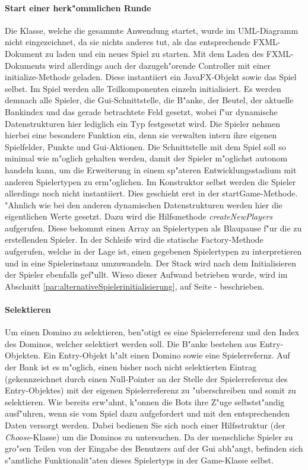 \paragraph{Start einer herk"ommlichen Runde}
Die Klasse, welche die gesammte Anwendung startet, wurde im UML-Diagramm nicht eingezeichnet, da sie nichts anderes tut, als das entsprechende FXML-Dokument zu laden und ein neues Spiel zu starten. Mit dem Laden des FXML-Dokuments wird allerdings auch der dazugeh"orende Controller mit einer initialize-Methode geladen. Diese instantiiert ein JavaFX-Objekt sowie das Spiel selbst. Im Spiel werden alle Teilkomponenten einzeln initialisiert. Es werden demnach alle Spieler, die Gui-Schnittstelle, die B"anke, der Beutel, der aktuelle Bankindex und das gerade betrachtete Feld gesetzt, wobei f"ur dynamische Datenstrukturen hier lediglich ein Typ festgesetzt wird. Die Spieler nehmen hierbei eine besondere Funktion ein, denn sie verwalten intern ihre eigenen Spielfelder, Punkte und Gui-Aktionen. Die Schnittstelle mit dem Spiel soll so minimal wie m"oglich gehalten werden, damit der Spieler m"oglichst autonom handeln kann, um die Erweiterung in einem sp"ateren Entwicklungsstadium mit anderen Spielertypen zu erm"oglichen. Im Konstruktor selbst werden die Spieler allerdings noch nicht instantiiert. Dies geschieht erst in der startGame-Methode. "Ahnlich wie bei den anderen dynamischen Datenstrukturen werden hier die eigentlichen Werte gesetzt. Dazu wird die Hilfsmethode \emph{createNewPlayers} aufgerufen. Diese bekommt einen Array an Spielertypen als \glqq Blaupause\grqq {} f"ur die zu erstellenden Spieler. In der Schleife wird die statische Factory-Methode aufgerufen, welche in der Lage ist, einen gegebenen Spielertypen zu interpretieren und in eine Spielerinstanz umzuwandeln. Der Stack wird nach dem Initialisieren der Spieler ebenfalls gef"ullt. Wieso dieser Aufwand betrieben wurde, wird im Abschnitt \ref{par:alternativeSpielerinitialisierung}, auf Seite \pageref{par:alternativeSpielerinitialisierung} -  beschrieben. 

\paragraph{Selektieren}
Um einen Domino zu selektieren, ben"otigt es eine Spielerreferenz und den Index des Dominos, welcher selektiert werden soll. Die B"anke bestehen aus Entry-Objekten. Ein Entry-Objekt h"alt einen Domino sowie eine Spielerrefernz. 
Auf der Bank ist es m"oglich, einen bisher noch nicht selektierten Eintrag (gekennzeichnet durch einen Null-Pointer an der Stelle der Spielerreferenz des Entry-Objektes) mit der eigenen Spielerreferenz zu "uberschreiben und somit zu selektieren. Wie bereits erw"ahnt, k"onnen die Bots ihre Z"uge selbstst"andig ausf"uhren, wenn sie vom Spiel dazu aufgefordert und mit den entsprechenden Daten versorgt werden. Dabei bedienen Sie sich noch einer Hilfsstruktur (der \emph{Choose}-Klasse) um die Dominos zu untersuchen. Da der menschliche Spieler zu gro"sen Teilen von der Eingabe des Benutzers auf der Gui abh"angt, befinden sich s"amtliche Funktionalit"aten dieses Spielertyps in der Game-Klasse selbst. 

